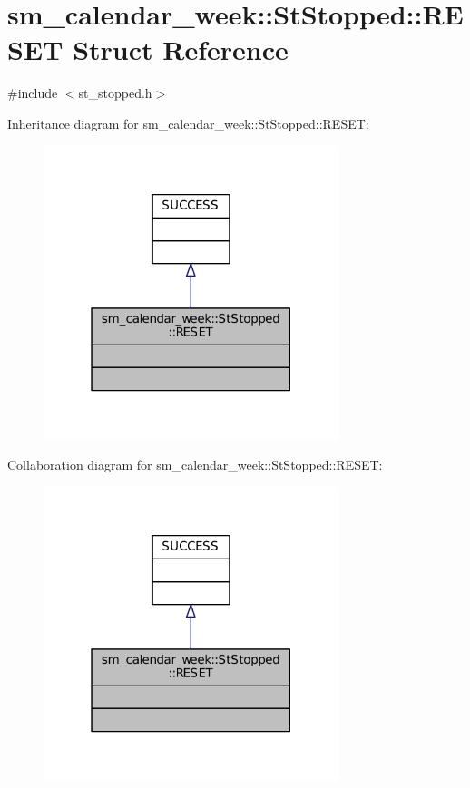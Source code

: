 \hypertarget{structsm__calendar__week_1_1StStopped_1_1RESET}{}\section{sm\+\_\+calendar\+\_\+week\+:\+:St\+Stopped\+:\+:R\+E\+S\+ET Struct Reference}
\label{structsm__calendar__week_1_1StStopped_1_1RESET}


{\ttfamily \#include $<$st\+\_\+stopped.\+h$>$}



Inheritance diagram for sm\+\_\+calendar\+\_\+week\+:\+:St\+Stopped\+:\+:R\+E\+S\+ET\+:
\nopagebreak
\begin{figure}[H]
\begin{center}
\leavevmode
\includegraphics[width=244pt]{structsm__calendar__week_1_1StStopped_1_1RESET__inherit__graph}
\end{center}
\end{figure}


Collaboration diagram for sm\+\_\+calendar\+\_\+week\+:\+:St\+Stopped\+:\+:R\+E\+S\+ET\+:
\nopagebreak
\begin{figure}[H]
\begin{center}
\leavevmode
\includegraphics[width=244pt]{structsm__calendar__week_1_1StStopped_1_1RESET__coll__graph}
\end{center}
\end{figure}


